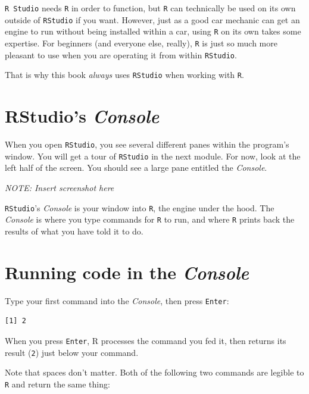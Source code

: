 \documentclass[
]{book}
\begin{document}
\texttt{R\ Studio} needs \texttt{R} in order to function, but \texttt{R} can technically be used on its own outside of \texttt{RStudio} if you want. However, just as a good car mechanic can get an engine to run without being installed within a car, using \texttt{R} on its own takes some expertise. For beginners (and everyone else, really), \texttt{R} is just so much more pleasant to use when you are operating it from within \texttt{RStudio}.

That is why this book \emph{always} uses \texttt{RStudio} when working with \texttt{R}.

\hypertarget{rstudios-console}{%
\section*{\texorpdfstring{RStudio's \emph{Console}}{RStudio's Console}}\label{rstudios-console}}

When you open \texttt{RStudio}, you see several different panes within the program's window. You will get a tour of \texttt{RStudio} in the next module. For now, look at the left half of the screen. You should see a large pane entitled the \emph{Console}.

\emph{NOTE: Insert screenshot here}

\texttt{RStudio}'s \emph{Console} is your window into \texttt{R}, the engine under the hood. The \emph{Console} is where you type commands for \texttt{R} to run, and where \texttt{R} prints back the results of what you have told it to do.

\hypertarget{running-code-in-the-console}{%
\section*{\texorpdfstring{Running code in the \emph{Console}}{Running code in the Console}}\label{running-code-in-the-console}}

Type your first command into the \emph{Console}, then press \texttt{Enter}:

\begin{verbatim}
[1] 2
\end{verbatim}

When you press \texttt{Enter}, R processes the command you fed it, then returns its result (\texttt{2}) just below your command.

Note that spaces don't matter. Both of the following two commands are legible to \texttt{R} and return the same thing:
\end{document}
